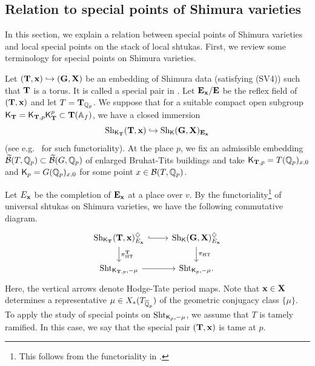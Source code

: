 \documentclass[12pt,reqno]{amsart}
\begin{document}
\subsection{Relation to special points of Shimura varieties} \label{ssec:special_points}

In this section, we explain a relation between special points of Shimura varieties and local special points on the stack of local shtukas. First, we review some terminology for special points on Shimura varieties. 


Let $(\mathbf{T}, \mathbf{x}) \hookrightarrow (\mathbf{G}, \mathbf{X})$ be an embedding of Shimura data (satisfying (SV4)) such that $\mathbf{T}$ is a torus. It is called a special pair in \cite[Definition 12.5]{Mil05}. Let $\mathbf{E}_{\mathbf{x}} / \mathbf{E}$ be the reflex field of $(\mathbf{T}, \mathbf{x})$ and let $T = \mathbf{T}_{\mathbb{Q}_p}$. We suppose that for a suitable compact open subgroup ${\mathsf{K}}_{\mathbf{T}} = {\mathsf{K}}_{\mathbf{T}, p} {\mathsf{K}}_{\mathbf{T}}^p \subset \mathbf{T}(\mathbb{A}_f)$, we have a closed immersion
\begin{equation} \label{eq:Shimura_embedding}
    {\operatorname{Sh}}_{{\mathsf{K}}_{\mathbf{T}}}(\mathbf{T}, \mathbf{x}) \hookrightarrow {\operatorname{Sh}}_{{\mathsf{K}}}(\mathbf{G}, \mathbf{X})_{\mathbf{E}_{\mathbf{x}}}
\end{equation}
(see e.g.\ \cite[Section 4.3]{PR24} for such functoriality). At the place $p$, we fix an admissible embedding ${\mathcal{{\widetilde{B}}}}(T, \mathbb{Q}_p) \subset {\mathcal{{\widetilde{B}}}}(G, \mathbb{Q}_p)$ of enlarged Bruhat-Tits buildings and take ${\mathsf{K}}_{\mathbf{T}, p} = T(\mathbb{Q}_p)_{x, 0}$ and ${\mathsf{K}}_{p} = G(\mathbb{Q}_p)_{x, 0}$ for some point $x \in {\mathcal{B}}(T, \mathbb{Q}_p)$. %

Let $E_{\mathbf{x}}$ be the completion of $\mathbf{E}_{\mathbf{x}}$ at a place over $v$. By the functoriality\footnote{This follows from the functoriality in \cite[Proposition 1.1.1]{PR24}.} of universal shtukas on Shimura varieties, we have the following commutative diagram. 
\begin{equation} \label{eq:diag_HT}
    \begin{tikzcd}
        \Sh_{\msf{K}_{\mbf{T}}}(\mbf{T}, \mbf{x})_{E_{\mbf{x}}}^\diamondsuit \ar[r, hook] \ar[d, "\pi_{\HT}^{\mbf{T}}"] & \Sh_{\msf{K}}(\mbf{G}, \mbf{X})_{E_{\mbf{x}}}^\diamondsuit \ar[d, "\pi_\HT"] \\
        \Sht_{\msf{K}_{\mbf{T}, p}, -\mu} \ar[r] & \Sht_{\msf{K}_{p}, -\mu}. 
    \end{tikzcd}
\end{equation}
Here, the vertical arrows denote Hodge-Tate period maps. Note that $\mathbf{x} \in \mathbf{X}$ determines a representative $\mu \in X_*(T_{{\overline{\mathbb{Q}}}_p})$ of the geometric conjugacy class $\{ \mu \}$. To apply the study of special points on ${\operatorname{Sht}}_{{\mathsf{K}}_{p}, -\mu}$, we assume that $T$ is tamely ramified. In this case, we say that the special pair $(\mathbf{T}, \mathbf{x})$ is tame at $p$. 
\end{document}
